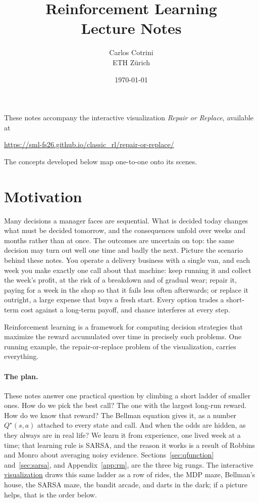 \documentclass[11pt,a4paper]{article}
\title{Reinforcement Learning\\[0.5ex]\large Lecture Notes}
\author{Carlos Cotrini\\ETH Zürich}
\date{\today}
\theoremstyle{definition}
\theoremstyle{remark}
\numberwithin{equation}{section}
\newcommand{\vizurl}{\url{https://sml-fs26.github.io/classic_rl/repair-or-replace/}}
\newcommand{\vizhref}[1]{\href{https://sml-fs26.github.io/classic_rl/repair-or-replace/}{#1}}
\begin{document}
\maketitle

\noindent
These notes accompany the interactive visualization \emph{Repair or Replace}, available at
\begin{center}
\vizurl
\end{center}
\noindent
The concepts developed below map one-to-one onto its scenes.

\medskip

\section{Motivation}

Many decisions a manager faces are sequential. What is decided today changes what must be
decided tomorrow, and the consequences unfold over weeks and months rather than at once. The
outcomes are uncertain on top: the same decision may turn out well one time and badly the
next. Picture the scenario behind these notes. You operate a delivery business with a single
van, and each week you make exactly one call about that machine: keep running it and collect
the week's profit, at the risk of a breakdown and of gradual wear; repair it, paying for a
week in the shop so that it fails less often afterwards; or replace it outright, a large
expense that buys a fresh start. Every option trades a short-term cost against a long-term
payoff, and chance interferes at every step.

Reinforcement learning is a framework for computing decision strategies that maximize the
reward accumulated over time in precisely such problems. One running example, the
repair-or-replace problem of the visualization, carries everything.

\paragraph{The plan.}
These notes answer one practical question by climbing a short ladder of smaller ones. How do
we pick the best call? The one with the largest long-run reward. How do we know that reward?
The Bellman equation gives it, as a number $Q^\star(s, a)$ attached to every state and call.
And when the odds are hidden, as they always are in real life? We learn it from experience,
one lived week at a time; that learning rule is SARSA, and the reason it works is a result of
Robbins and Monro about averaging noisy evidence. Sections~\ref{sec:qfunction}
and~\ref{sec:sarsa}, and Appendix~\ref{app:rm}, are the three big rungs. The interactive
\vizhref{visualization} draws this same ladder as a row of rides, the MDP maze, Bellman's
house, the SARSA maze, the bandit arcade, and darts in the dark; if a picture helps, that is
the order below.
\end{document}
